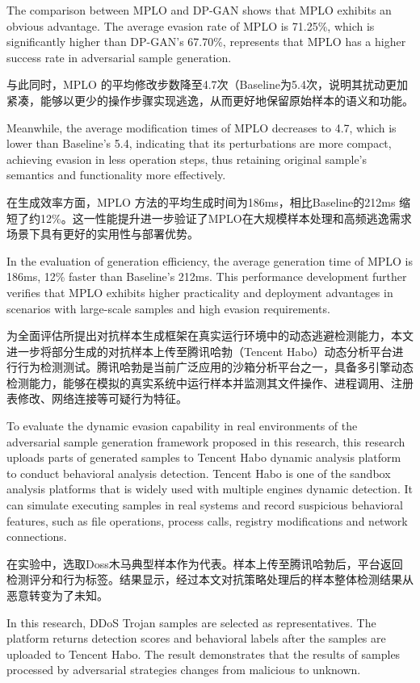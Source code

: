 The comparison between MPLO and DP-GAN shows that MPLO exhibits an obvious advantage. The average evasion rate of MPLO is 71.25\%, which is significantly higher than DP-GAN's 67.70\%, represents that MPLO has a higher success rate in adversarial sample generation.

与此同时，MPLO 的平均修改步数降至4.7次（Baseline为5.4次，说明其扰动更加紧凑，能够以更少的操作步骤实现逃逸，从而更好地保留原始样本的语义和功能。

Meanwhile, the average modification times of MPLO decreases to 4.7, which is lower than Baseline's 5.4, indicating that its perturbations are more compact, achieving evasion in less operation steps, thus retaining original sample's semantics and functionality more effectively.

在生成效率方面，MPLO 方法的平均生成时间为186ms，相比Baseline的212ms 缩短了约12\%。这一性能提升进一步验证了MPLO在大规模样本处理和高频逃逸需求场景下具有更好的实用性与部署优势。

In the evaluation of generation efficiency, the average generation time of MPLO is 186ms, 12\% faster than Baseline's 212ms. This performance development further verifies that MPLO exhibits higher practicality and deployment advantages in scenarios with large-scale samples and high evasion requirements.

为全面评估所提出对抗样本生成框架在真实运行环境中的动态逃避检测能力，本文进一步将部分生成的对抗样本上传至腾讯哈勃（Tencent Habo）动态分析平台进行行为检测测试。腾讯哈勃是当前广泛应用的沙箱分析平台之一，具备多引擎动态检测能力，能够在模拟的真实系统中运行样本并监测其文件操作、进程调用、注册表修改、网络连接等可疑行为特征。

To evaluate the dynamic evasion capability in real environments of the adversarial sample generation framework proposed in this research, this research uploads parts of generated samples to Tencent Habo dynamic analysis platform to conduct behavioral analysis detection. Tencent Habo is one of the sandbox analysis platforms that is widely used with multiple engines dynamic detection. It can simulate executing samples in real systems and record suspicious behavioral features, such as file operations, process calls, registry modifications and network connections.

在实验中，选取Doss木马典型样本作为代表。样本上传至腾讯哈勃后，平台返回检测评分和行为标签。结果显示，经过本文对抗策略处理后的样本整体检测结果从恶意转变为了未知。

In this research, DDoS Trojan samples are selected as representatives. The platform returns detection scores and behavioral labels after the samples are uploaded to Tencent Habo. The result demonstrates that the results of samples processed by adversarial strategies changes from malicious to unknown.

